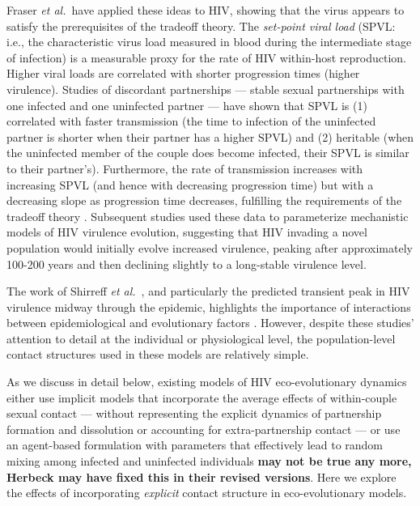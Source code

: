 \documentclass[10pt,letterpaper]{article}
\newcommand{\etal}{\textit{et al.}}
\newcommand{\todo}[1]{{\color{red} \textbf{#1}}}
\begin{document}
Fraser \etal\ have applied these ideas to HIV,
showing that the virus appears to satisfy the prerequisites of
the tradeoff theory.
The \emph{set-point viral load} (SPVL: i.e., the
characteristic virus load measured in blood during the intermediate
stage of infection) is a measurable proxy for the rate of HIV within-host
reproduction. Higher viral loads are correlated with 
shorter progression times (higher virulence).
Studies of discordant partnerships --- stable
sexual partnerships with one infected and one uninfected partner --- %
have shown that SPVL is (1) correlated with faster transmission
(the time to infection of the uninfected partner is shorter when
their partner has a higher SPVL) and (2) heritable
(when the uninfected member of
the couple does become infected, their SPVL is similar to their
partner's).
Furthermore, the rate of transmission increases with
increasing SPVL (and hence with decreasing progression time)
but with a decreasing slope as progression time decreases,
fulfilling the requirements of the tradeoff theory
 \cite{Fraser+2007}.
Subsequent studies
\cite{shirreff_transmission_2011,herbeck_hiv_2014,herbeck_evolution_2016} used these data to
parameterize mechanistic models of HIV virulence evolution, suggesting
that HIV invading a novel population would initially evolve increased
virulence, peaking after approximately 100-200 years and then declining
slightly to a long-stable virulence level.

The work of Shirreff \etal\ \cite{shirreff_transmission_2011}, and particularly the predicted transient peak in HIV virulence midway through the epidemic,
highlights the importance of interactions between epidemiological and
evolutionary factors \cite{day_virulence_2004,alizon_price_2009}.
However, despite these studies' attention to detail at the individual
or physiological level, the population-level contact structures used in these
models are relatively simple.

As we discuss in detail below,
existing models of HIV eco-evolutionary dynamics either use implicit
models that incorporate the average effects of within-couple sexual
contact --- without representing the explicit dynamics of partnership
formation and dissolution or accounting for extra-partnership contact %
--- or use an agent-based formulation with parameters that effectively
lead to random mixing among infected and uninfected individuals
\todo{may not be true any more, Herbeck may have fixed this in their revised versions}. Here
we explore the effects of incorporating \emph{explicit}
contact structure in eco-evolutionary models.
\end{document}
